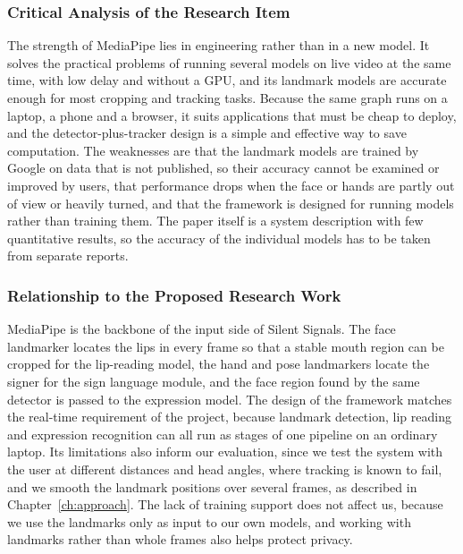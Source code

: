 \documentclass{FastFyp}
\begin{document}
\subsubsection*{Critical Analysis of the Research Item}
The strength of MediaPipe lies in engineering rather than in a new model. It solves the practical problems of running several models on live video at the same time, with low delay and without a GPU, and its landmark models are accurate enough for most cropping and tracking tasks. Because the same graph runs on a laptop, a phone and a browser, it suits applications that must be cheap to deploy, and the detector-plus-tracker design is a simple and effective way to save computation. The weaknesses are that the landmark models are trained by Google on data that is not published, so their accuracy cannot be examined or improved by users, that performance drops when the face or hands are partly out of view or heavily turned, and that the framework is designed for running models rather than training them. The paper itself is a system description with few quantitative results, so the accuracy of the individual models has to be taken from separate reports.

\subsubsection*{Relationship to the Proposed Research Work}
MediaPipe is the backbone of the input side of Silent Signals. The face landmarker locates the lips in every frame so that a stable mouth region can be cropped for the lip-reading model, the hand and pose landmarkers locate the signer for the sign language module, and the face region found by the same detector is passed to the expression model. The design of the framework matches the real-time requirement of the project, because landmark detection, lip reading and expression recognition can all run as stages of one pipeline on an ordinary laptop. Its limitations also inform our evaluation, since we test the system with the user at different distances and head angles, where tracking is known to fail, and we smooth the landmark positions over several frames, as described in Chapter~\ref{ch:approach}. The lack of training support does not affect us, because we use the landmarks only as input to our own models, and working with landmarks rather than whole frames also helps protect privacy.
\end{document}
